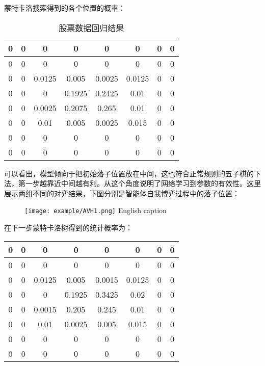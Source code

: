 蒙特卡洛搜索得到的各个位置的概率：
\begin{table}[b]
	\centering
	\caption{股票数据回归结果}
\begin{tabular}{|c|c|c|c|c|c|c|c|}
		\hline 
		0& 0 & 0 & 0 & 0 & 0 &  0&  0\\ 
		\hline 
		0& 0 & 0 & 0 & 0 & 0 &  0&  0\\ 
		\hline 
		0 & 0 & 0.0125 & 0.005 & 0.0025 & 0.0125 & 0 & 0 \\ 
		\hline 
		0 & 0 & 0 & 0.1925 & 0.2425 & 0.01 & 0 & 0 \\ 
		\hline 
		0 & 0 & 0.0025 & 0.2075 & 0.265 & 0.01 & 0 & 0 \\ 
		\hline 
		0 & 0 & 0.01 & 0.005 & 0.0025 & 0.015 & 0 & 0 \\ 
		\hline 
		0 & 0 & 0 & 0 & 0 & 0 & 0 & 0 \\ 
		\hline 
		0 & 0 & 0 & 0 & 0 & 0 & 0 & 0 \\  
		\hline 
\end{tabular} 
\end{table}

可以看出，模型倾向于把初始落子位置放在中间，这也符合正常规则的五子棋的下法，第一步越靠近中间越有利。从这个角度说明了网络学习到参数的有效性。这里展示两组不同的对弈结果，下图分别是智能体自我博弈过程中的落子位置：

\begin{figure}[!htp]
	\centering
	\texttt{[image: example/AVH1.png]}
	\hspace{0.5cm}
	{English caption}
	\label{fig:AIvsAI}
\end{figure}

在下一步蒙特卡洛树得到的统计概率为：

\begin{tabular}{|c|c|c|c|c|c|c|c|}
	\hline 
	0& 0 & 0 & 0 & 0 & 0 &  0&  0\\ 
	\hline 
	0& 0 & 0 & 0 & 0 & 0 &  0&  0\\ 
	\hline 
	0 & 0 & 0.0125 & 0.005 & 0.0015 & 0.0125 & 0 & 0 \\ 
	\hline 
	0 & 0 & 0 & 0.1925 & 0.3425 & 0.02 & 0 & 0 \\ 
	\hline 
	0 & 0 & 0.0015 & 0.205 & 0.245 & 0.01 & 0 & 0 \\ 
	\hline 
	0 & 0 & 0.01 & 0.0025 & 0.005 & 0.015 & 0 & 0 \\ 
	\hline 
	0 & 0 & 0 & 0 & 0 & 0 & 0 & 0 \\ 
	\hline 
	0 & 0 & 0 & 0 & 0 & 0 & 0 & 0 \\  
	\hline 
\end{tabular} 

